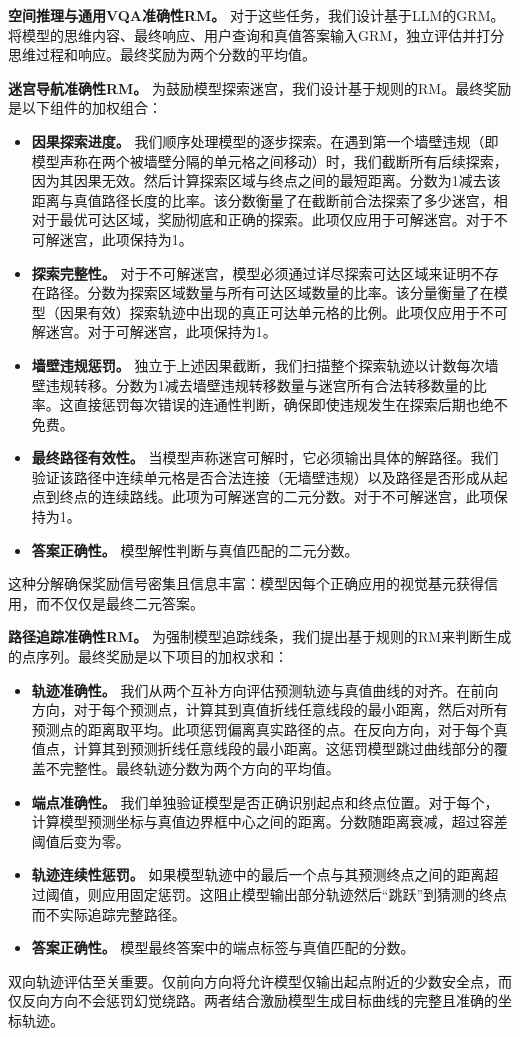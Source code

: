 \documentclass[11pt,a4paper]{article}
\begin{document}
\textbf{空间推理与通用VQA准确性RM。} 对于这些任务，我们设计基于LLM的GRM。将模型的思维内容、最终响应、用户查询和真值答案输入GRM，独立评估并打分思维过程和响应。最终奖励为两个分数的平均值。

\textbf{迷宫导航准确性RM。} 为鼓励模型探索迷宫，我们设计基于规则的RM。最终奖励是以下组件的加权组合：
\begin{itemize}
    \item \textbf{因果探索进度。} 我们顺序处理模型的逐步探索。在遇到第一个墙壁违规（即模型声称在两个被墙壁分隔的单元格之间移动）时，我们截断所有后续探索，因为其因果无效。然后计算探索区域与终点之间的最短距离。分数为1减去该距离与真值路径长度的比率。该分数衡量了在截断前合法探索了多少迷宫，相对于最优可达区域，奖励彻底和正确的探索。此项仅应用于可解迷宫。对于不可解迷宫，此项保持为1。
    \item \textbf{探索完整性。} 对于不可解迷宫，模型必须通过详尽探索可达区域来证明不存在路径。分数为探索区域数量与所有可达区域数量的比率。该分量衡量了在模型（因果有效）探索轨迹中出现的真正可达单元格的比例。此项仅应用于不可解迷宫。对于可解迷宫，此项保持为1。
    \item \textbf{墙壁违规惩罚。} 独立于上述因果截断，我们扫描整个探索轨迹以计数每次墙壁违规转移。分数为1减去墙壁违规转移数量与迷宫所有合法转移数量的比率。这直接惩罚每次错误的连通性判断，确保即使违规发生在探索后期也绝不免费。
    \item \textbf{最终路径有效性。} 当模型声称迷宫可解时，它必须输出具体的解路径。我们验证该路径中连续单元格是否合法连接（无墙壁违规）以及路径是否形成从起点到终点的连续路线。此项为可解迷宫的二元分数。对于不可解迷宫，此项保持为1。
    \item \textbf{答案正确性。} 模型解性判断与真值匹配的二元分数。
\end{itemize}
这种分解确保奖励信号密集且信息丰富：模型因每个正确应用的视觉基元获得信用，而不仅仅是最终二元答案。

\textbf{路径追踪准确性RM。} 为强制模型追踪线条，我们提出基于规则的RM来判断生成的点序列。最终奖励是以下项目的加权求和：
\begin{itemize}
    \item \textbf{轨迹准确性。} 我们从两个互补方向评估预测轨迹与真值曲线的对齐。在前向方向，对于每个预测点，计算其到真值折线任意线段的最小距离，然后对所有预测点的距离取平均。此项惩罚偏离真实路径的点。在反向方向，对于每个真值点，计算其到预测折线任意线段的最小距离。这惩罚模型跳过曲线部分的覆盖不完整性。最终轨迹分数为两个方向的平均值。
    \item \textbf{端点准确性。} 我们单独验证模型是否正确识别起点和终点位置。对于每个，计算模型预测坐标与真值边界框中心之间的距离。分数随距离衰减，超过容差阈值后变为零。
    \item \textbf{轨迹连续性惩罚。} 如果模型轨迹中的最后一个点与其预测终点之间的距离超过阈值，则应用固定惩罚。这阻止模型输出部分轨迹然后“跳跃”到猜测的终点而不实际追踪完整路径。
    \item \textbf{答案正确性。} 模型最终答案中的端点标签与真值匹配的分数。
\end{itemize}
双向轨迹评估至关重要。仅前向方向将允许模型仅输出起点附近的少数安全点，而仅反向方向不会惩罚幻觉绕路。两者结合激励模型生成目标曲线的完整且准确的坐标轨迹。
\end{document}
